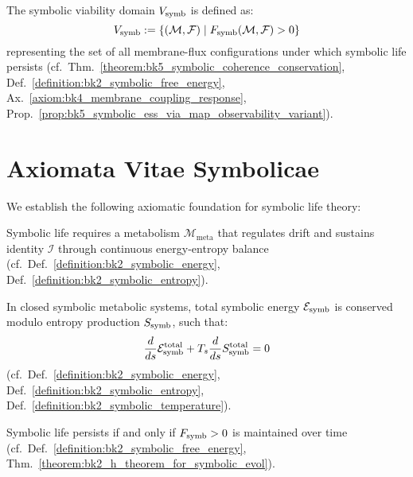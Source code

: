 \begin{definition}
\label{definition:bk5_viability_domain}
The symbolic viability domain $V_{\mathrm{symb}}$ is defined as:
\begin{equation}
V_{\mathrm{symb}} := \{ (\mathcal{M}, \mathcal{F}) \mid F_{\mathrm{symb}}(\mathcal{M}, \mathcal{F}) > 0 \}
\end{equation}
\noindent representing the set of all membrane-flux configurations under which symbolic life persists (cf.~Thm.~\ref{theorem:bk5_symbolic_coherence_conservation}, Def.~\ref{definition:bk2_symbolic_free_energy}, Ax.~\ref{axiom:bk4_membrane_coupling_response}, Prop.~\ref{prop:bk5_symbolic_ess_via_map_observability_variant}).
\end{definition}
\section{Axiomata Vitae Symbolicae}
\label{sec:bk5_axiomata_vitae_symbolicae}
We establish the following axiomatic foundation for symbolic life theory:

\begin{axiom}
\label{axiom:bk5_metabolic_persistence}
Symbolic life requires a metabolism $\mathcal{M}_{\mathrm{meta}}$ that regulates drift and sustains identity $\mathcal{I}$ through continuous energy-entropy balance (cf.~Def.~\ref{definition:bk2_symbolic_energy}, Def.~\ref{definition:bk2_symbolic_entropy}).
\end{axiom}

\begin{axiom}
\label{axiom:bk5_energy_conservation}
In closed symbolic metabolic systems, total symbolic energy $\mathcal{E}_{\mathrm{symb}}$ is conserved modulo entropy production $S_{\mathrm{symb}}$, such that:
\begin{equation}
\frac{d}{ds}\mathcal{E}_{\mathrm{symb}}^{\mathrm{total}} + T_s\frac{d}{ds}S_{\mathrm{symb}}^{\mathrm{total}} = 0
\end{equation}
(cf.~Def.~\ref{definition:bk2_symbolic_energy}, Def.~\ref{definition:bk2_symbolic_entropy}, Def.~\ref{definition:bk2_symbolic_temperature}).
\end{axiom}

\begin{axiom}
\label{axiom:bk5_positive_free_energy}
Symbolic life persists if and only if $F_{\mathrm{symb}} > 0$ is maintained over time (cf.~Def.~\ref{definition:bk2_symbolic_free_energy}, Thm.~\ref{theorem:bk2_h_theorem_for_symbolic_evol}).
\end{axiom}

